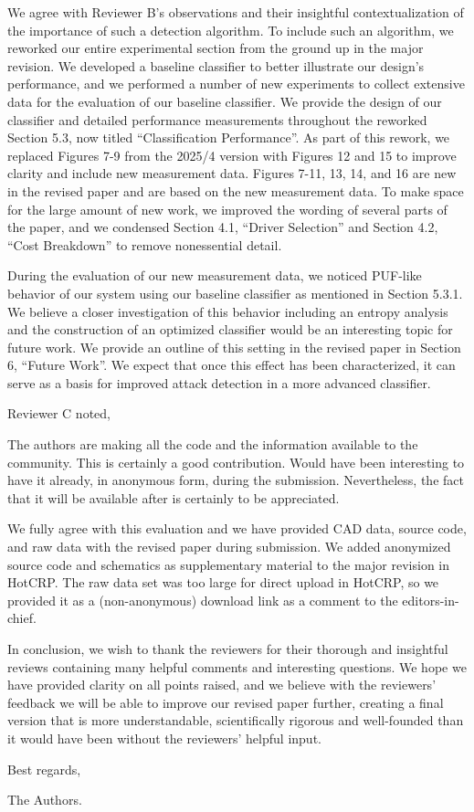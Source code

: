 \documentclass[a4paper, 10pt]{article}
\begin{document}
We agree with Reviewer B's observations and their insightful contextualization of the importance of such a detection
algorithm. To include such an algorithm, we reworked our entire experimental section from the ground up in the major
revision. We developed a baseline classifier to better illustrate our design's performance, and we performed a number of
new experiments to collect extensive data for the evaluation of our baseline classifier. We provide the design of our
classifier and detailed performance measurements throughout the reworked Section 5.3, now titled ``Classification
Performance''. As part of this rework, we replaced Figures 7-9 from the 2025/4 version with Figures 12 and 15 to improve
clarity and include new measurement data. Figures 7-11, 13, 14, and 16 are new in the revised paper and are based on the
new measurement data. To make space for the large amount of new work, we improved the wording of several parts of the
paper, and we condensed Section 4.1, ``Driver Selection'' and Section 4.2, ``Cost Breakdown'' to remove nonessential
detail.

During the evaluation of our new measurement data, we noticed PUF-like behavior of our system using our baseline
classifier as mentioned in Section 5.3.1. We believe a closer investigation of this behavior including an entropy
analysis and the construction of an optimized classifier would be an interesting topic for future work. We provide an
outline of this setting in the revised paper in Section 6, ``Future Work''. We expect that once this effect has been
characterized, it can serve as a basis for improved attack detection in a more advanced classifier.

Reviewer C noted,
\begin{displayquote}
    The authors are making all the code and the information available to the community. This is certainly a good
    contribution. Would have been interesting to have it already, in anonymous form, during the submission.
    Nevertheless, the fact that it will be available after is certainly to be appreciated.
\end{displayquote}

We fully agree with this evaluation and we have provided CAD data, source code, and raw data with the revised paper
during submission. We added anonymized source code and schematics as supplementary material to the major revision in
HotCRP. The raw data set was too large for direct upload in HotCRP, so we provided it as a (non-anonymous) download link
as a comment to the editors-in-chief.

In conclusion, we wish to thank the reviewers for their thorough and insightful reviews containing many helpful comments
and interesting questions. We hope we have provided clarity on all points raised, and we believe with the reviewers'
feedback we will be able to improve our revised paper further, creating a final version that is more understandable,
scientifically rigorous and well-founded than it would have been without the reviewers' helpful input.

\vspace*{10mm}
Best regards,

The Authors.
\end{document}
